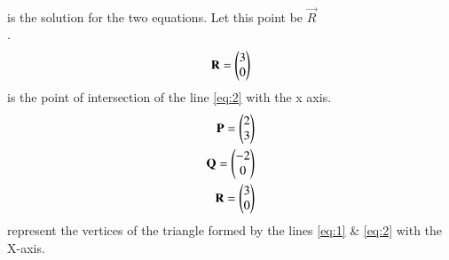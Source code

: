 \documentclass[journal,12pt,twocolumn]{IEEEtran}
\renewcommand\thesection{\arabic{section}}
\begin{document}
\begin{enumerate}[label=\thesection.\arabic*.,ref=\thesection.\theenumi]
\begin{enumerate}
\begin{align}
\end{align} 
is the solution for the two equations. 
Let this point be $\vec{R}$\\.
\begin{align}
    \mathbf{R}=\begin{pmatrix}3\\0\end{pmatrix}
\end{align}
is the point of intersection of the line \ref{eq:2} with the x axis.
\\
    \begin{align}
        \mathbf{P}=\begin{pmatrix}2\\3\end{pmatrix}\\ \mathbf{Q}=\begin{pmatrix}-2\\0\end{pmatrix}\\ \mathbf{R}=\begin{pmatrix}3\\0\end{pmatrix}\\
    \end{align}
    represent the vertices of the triangle formed by the lines \ref{eq:1} \& \ref{eq:2}
    with the X-axis.\\\\


\end{enumerate}
\end{enumerate}
\end{document}
